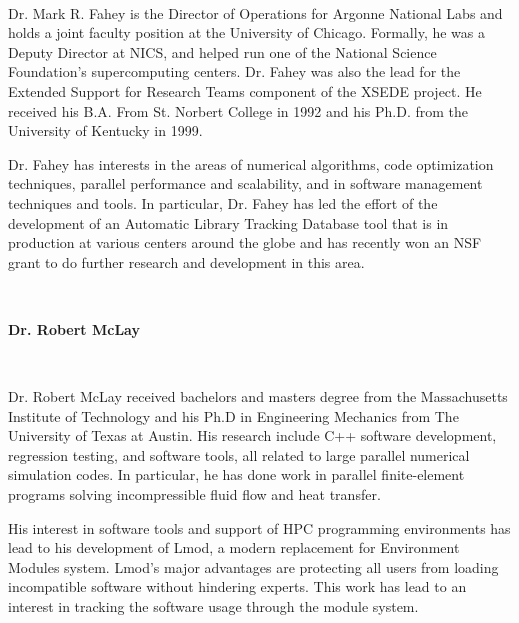 \documentclass[12pt]{article}
\begin{document}
~~

\noindent
Dr. Mark R. Fahey is the Director of Operations for Argonne National
Labs and holds a joint faculty position at the University of
Chicago. Formally, he was a Deputy Director at NICS, and helped run one of
the National Science Foundation’s supercomputing centers.  Dr. Fahey
was also the lead for the Extended Support for Research Teams component
of the XSEDE project.  He received his B.A. From St. Norbert
College in 1992 and his Ph.D. from the University of Kentucky in 1999.  

Dr. Fahey has interests in the areas of numerical algorithms, code
optimization techniques, parallel performance and scalability, and in
software management techniques and tools.  In particular, Dr. Fahey
has led the effort of the development of an Automatic Library Tracking
Database tool that is in production at various centers around the
globe and has recently won an NSF grant to do further research and
development in this area. 

~~

\noindent
{\bf{}Dr. Robert McLay}

~~

\noindent
Dr. Robert McLay received bachelors and masters degree from the Massachusetts 
Institute of Technology and his Ph.D in Engineering Mechanics from The University 
of Texas at Austin.  His research include C++ software development, regression 
testing, and software tools, all related to large parallel numerical simulation codes.  
In particular, he has done work in parallel finite-element programs solving 
incompressible fluid flow and heat transfer.

His interest in software tools and support of HPC programming environments has 
lead to his development of Lmod, a modern replacement for Environment Modules 
system.  Lmod's major advantages are protecting all users from loading incompatible 
software without hindering experts.  This work has lead to an interest in tracking the 
software usage through the module system.
\end{document}
